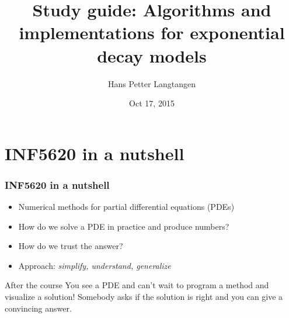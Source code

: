 \documentclass{beamer}
\begin{document}








\title{Study guide: Algorithms and implementations for exponential decay models}


\author{Hans Petter Langtangen}

\date{Oct 17, 2015
}

\begin{frame}
\titlepage
\end{frame}

\section{INF5620 in a nutshell}

\begin{frame}
\frametitle{INF5620 in a nutshell}

\label{5620:about}

\begin{itemize}
 \item Numerical methods for partial differential equations (PDEs)

 \item How do we solve a PDE in practice and produce numbers?

 \item How do we trust the answer?

 \item Approach: \emph{simplify, understand, generalize}
\end{itemize}

\noindent
\begin{block}{After the course }
You see a PDE and can't wait to program a method
and visualize a solution! Somebody asks if the solution is right
and you can give a convincing answer.
\end{block}


\end{frame}
\end{document}
